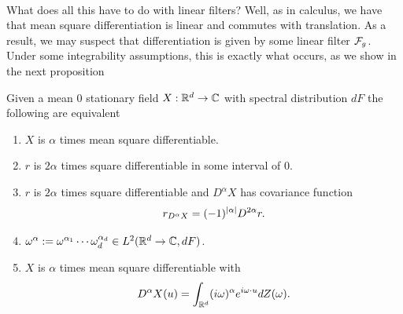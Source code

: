 \documentclass[
    a4paper,
    DIV=14,
    abstract=true,
    numbers=noenddot
]{scrartcl}
\begin{document}
\\
What does all this have to do with linear filters? Well, as in calculus, we have that mean square differentiation is linear and commutes with translation. As a result, we may suspect that differentiation is given by some linear filter $\mathcal{F}_g$. Under some integrability assumptions, this is exactly what occurs, as we show in the next proposition
\begin{theorem}\label{diff fields theorem}
	Given a mean $0$ stationary  field $X:\mathbb{R}^d\to\mathbb{C}$ with spectral distribution $dF$ the following are equivalent
	\begin{enumerate}
		\item $X$ is $\alpha$ times mean square differentiable.\label{p1}
		\item $r$ is $2\alpha$ times square differentiable in some interval of $0$.
		\item $r$ is $2\alpha$ times square differentiable and $D^\alpha X$ has covariance function
		      \begin{equation*}
			      r_{D^\alpha X}=(-1)^{\left| \alpha \right|}D^{2\alpha}r.
		      \end{equation*}
		\item $\omega^\alpha:=\omega^{\alpha_1}\cdots \omega_d^{\alpha_d}\in L^2(\mathbb{R}^d\to\mathbb{C},dF)$.
		\item $X$ is $\alpha$ times mean square differentiable with
		      \begin{equation}\label{deriv X equation}
			      D^\alpha X(u)=\int_{\mathbb{R}^d}(i\omega)^{\alpha}e^{i\omega\cdot u}dZ(\omega).
		      \end{equation}
	\end{enumerate}
\end{theorem}
\end{document}
